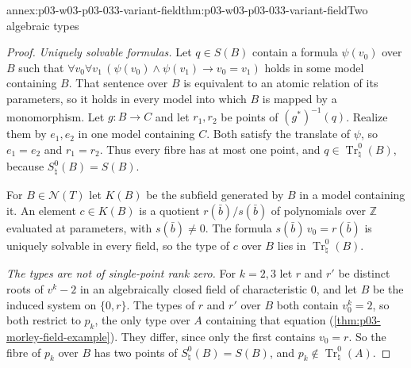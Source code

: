 \begin{annexitem}{annex:p03-w03-p03-033-variant-field}{thm:p03-w03-p03-033-variant-field}{Two algebraic types}
\begin{proof}
\emph{Uniquely solvable formulas.} Let \(q\in S(B)\) contain a formula
\(\psi(v_0)\) over \(B\) such that
\(\forall v_0\forall v_1\,(\psi(v_0)\wedge\psi(v_1)\to v_0=v_1)\) holds in
some model containing \(B\). That sentence over \(B\) is equivalent to an
atomic relation of its parameters, so it holds in every model into which
\(B\) is mapped by a monomorphism. Let \(g:B\to C\) and let \(r_1,r_2\) be
points of \((g^*)^{-1}(q)\). Realize them by \(e_1,e_2\) in one model
containing \(C\). Both satisfy the translate of \(\psi\), so \(e_1=e_2\)
and \(r_1=r_2\). Thus every fibre has at most one point, and
\(q\in\operatorname{Tr}_\natural^0(B)\), because
\(S_\natural^0(B)=S(B)\).

For \(B\in\mathcal N(T)\) let \(K(B)\) be the subfield generated by
\(B\) in a model containing it. An element \(c\in K(B)\) is a quotient
\(r(\bar b)/s(\bar b)\) of polynomials over \(\mathbb Z\) evaluated at
parameters, with \(s(\bar b)\ne0\). The formula
\(s(\bar b)\,v_0=r(\bar b)\) is uniquely solvable in every field, so the
type of \(c\) over \(B\) lies in \(\operatorname{Tr}_\natural^0(B)\).

\emph{The types are not of single-point rank zero.} For \(k=2,3\) let
\(r\) and \(r'\) be distinct roots of \(v^k-2\) in an algebraically closed
field of characteristic \(0\), and let \(B\) be the induced system on
\(\{0,r\}\). The types of \(r\) and \(r'\) over \(B\) both contain
\(v_0^k=2\), so both restrict to \(p_k\), the only type over \(A\)
containing that equation (\cref{thm:p03-morley-field-example}). They
differ, since only the first contains \(v_0=r\). So the fibre of \(p_k\)
over \(B\) has two points of \(S_\natural^0(B)=S(B)\), and
\(p_k\notin\operatorname{Tr}_\natural^0(A)\).


\end{proof}
\end{annexitem}
